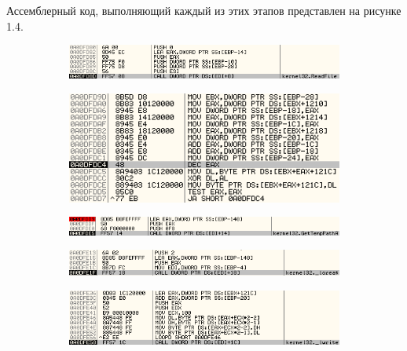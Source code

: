 Ассемблерный код, выполняющий каждый из этих этапов представлен на рисунке 1.4.
\newpage
\begin{figure}[ht]
    \centering
    \begin{subfigure}[h]{0.6\textwidth}
    \centering
        \includegraphics[scale=0.7]{1.pdf/pasted-image-31.png}
        \caption{}        
    \end{subfigure}
    \begin{subfigure}[h]{0.6\textwidth}
    \centering
        \includegraphics[scale=0.7]{1.pdf/pasted-image-33.png}
        \caption{}
      
    \end{subfigure}
    \begin{subfigure}[h]{0.6\textwidth}
    \centering
        \includegraphics[scale=0.7]{1.pdf/pasted-image-35.png}
        \caption{}
        
    \end{subfigure}
    \begin{subfigure}[h]{0.6\textwidth}
    \centering
        \includegraphics[scale=0.7]{1.pdf/pasted-image-37.png}
        \caption{}
        
    \end{subfigure}
    \begin{subfigure}[h]{0.6\textwidth}
    \centering
        \includegraphics[scale=0.7]{1.pdf/pasted-image-39.png}
        \caption{}
        

\end{subfigure}
\end{figure}
